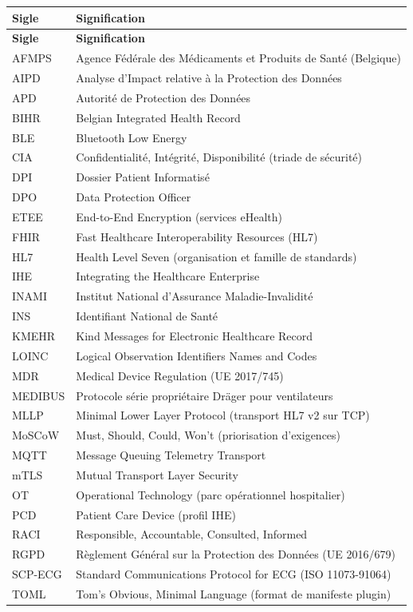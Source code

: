 \bridgezebra
\begin{longtable}{p{3cm}p{12cm}}
  \toprule
  \rowcolor{bridgeblue!90}
  {\color{white}\bfseries Sigle} & {\color{white}\bfseries Signification} \\
  \midrule
  \endfirsthead
  \toprule
  \rowcolor{bridgeblue!90}
  {\color{white}\bfseries Sigle} & {\color{white}\bfseries Signification} \\
  \midrule
  \endhead
  \bottomrule
  \endfoot
  AFMPS & Agence Fédérale des Médicaments et Produits de Santé (Belgique) \\
  AIPD & Analyse d'Impact relative à la Protection des Données \\
  APD & Autorité de Protection des Données \\
  BIHR & Belgian Integrated Health Record \\
  BLE & Bluetooth Low Energy \\
  CIA & Confidentialité, Intégrité, Disponibilité (triade de sécurité) \\
  DPI & Dossier Patient Informatisé \\
  DPO & Data Protection Officer \\
  ETEE & End-to-End Encryption (services eHealth) \\
  FHIR & Fast Healthcare Interoperability Resources (HL7) \\
  HL7 & Health Level Seven (organisation et famille de standards) \\
  IHE & Integrating the Healthcare Enterprise \\
  INAMI & Institut National d'Assurance Maladie-Invalidité \\
  INS & Identifiant National de Santé \\
  KMEHR & Kind Messages for Electronic Healthcare Record \\
  LOINC & Logical Observation Identifiers Names and Codes \\
  MDR & Medical Device Regulation (UE 2017/745) \\
  MEDIBUS & Protocole série propriétaire Dräger pour ventilateurs \\
  MLLP & Minimal Lower Layer Protocol (transport HL7 v2 sur TCP) \\
  MoSCoW & Must, Should, Could, Won't (priorisation d'exigences) \\
  MQTT & Message Queuing Telemetry Transport \\
  mTLS & Mutual Transport Layer Security \\
  OT & Operational Technology (parc opérationnel hospitalier) \\
  PCD & Patient Care Device (profil IHE) \\
  RACI & Responsible, Accountable, Consulted, Informed \\
  RGPD & Règlement Général sur la Protection des Données (UE 2016/679) \\
  SCP-ECG & Standard Communications Protocol for ECG (ISO 11073-91064) \\
  TOML & Tom's Obvious, Minimal Language (format de manifeste plugin) \\
\end{longtable}

